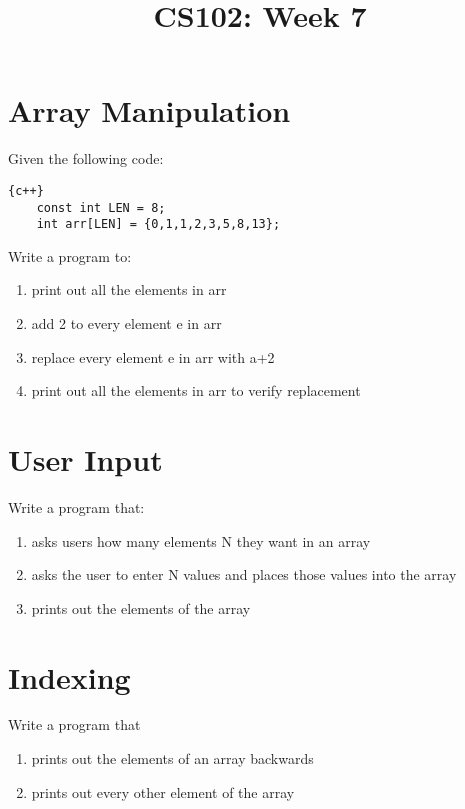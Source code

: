 \documentclass{article}
\begin{document}
\title{CS102: Week 7}

\maketitle

\section*{Array Manipulation}
Given the following code:
\begin{lstlisting}{c++}
	const int LEN = 8;
	int arr[LEN] = {0,1,1,2,3,5,8,13};
\end{lstlisting}
Write a program to:
\begin{enumerate}
	\item print out all the elements in arr
	\item add 2 to every element e in arr
	\item replace every element e in arr with a+2
	\item print out all the elements in arr to verify replacement
\end{enumerate}

\section*{User Input}
Write a program that:
\begin{enumerate}
	\item asks users how many elements N they want in an array
	\item asks the user to enter N values and places those values into the array
	\item prints out the elements of the array
\end{enumerate}

\section*{Indexing}
Write a program that
\begin{enumerate}
	\item prints out the elements of an array backwards
	\item prints out every other element of the array
\end{enumerate}
\pagebreak
\end{document}

